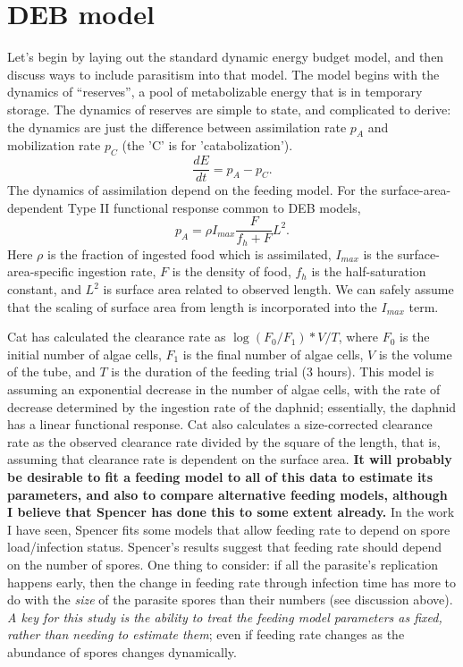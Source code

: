 \documentclass[11pt,reqno,final,pdftex]{amsart}\usepackage[]{graphicx}\usepackage[]{color}
\theoremstyle{plain}
\numberwithin{equation}{part}
\begin{document}
\section*{DEB model}

Let's begin by laying out the standard dynamic energy budget model, and then discuss ways to include parasitism into that model.
The model begins with the dynamics of ``reserves'', a pool of metabolizable energy that is in temporary storage.
The dynamics of reserves are simple to state, and complicated to derive: the dynamics are just the difference between assimilation rate $p_A$ and mobilization rate $p_C$ (the 'C' is for 'catabolization').
\begin{equation}
\frac{dE}{dt} = p_A - p_C.
\end{equation}
The dynamics of assimilation depend on the feeding model. For the surface-area-dependent Type II functional response common to DEB models,
\begin{equation}
p_A = \rho I_{max} \frac{F}{f_h + F} L^2.
\end{equation}
Here $\rho$ is the fraction of ingested food which is assimilated, $I_{max}$ is the surface-area-specific ingestion rate, $F$ is the density of food, $f_h$ is the half-saturation constant, and $L^2$ is surface area related to observed length.
We can safely assume that the scaling of surface area from length is incorporated into the $I_{max}$ term.

Cat has calculated the clearance rate as $\log(F_0/F_1)*V/T$, where $F_0$ is the initial number of algae cells, $F_1$ is the final number of algae cells, $V$ is the volume of the tube, and $T$ is the duration of the feeding trial (3 hours).
This model is assuming an exponential decrease in the number of algae cells, with the rate of decrease determined by the ingestion rate of the daphnid; essentially, the daphnid has a linear functional response.
Cat also calculates a size-corrected clearance rate as the observed clearance rate divided by the square of the length, that is, assuming that clearance rate is dependent on the surface area.
\textbf{It will probably be desirable to fit a feeding model to all of this data to estimate its parameters, and also to compare alternative feeding models, although I believe that Spencer has done this to some extent already.}
In the work I have seen, Spencer fits some models that allow feeding rate to depend on spore load/infection status.
Spencer's results suggest that feeding rate should depend on the number of spores.
One thing to consider: if all the parasite's replication happens early, then the change in feeding rate through infection time has more to do with the \emph{size} of the parasite spores than their numbers (see discussion above).
\emph{A key for this study is the ability to treat the feeding model parameters as fixed, rather than needing to estimate them}; even if feeding rate changes as the abundance of spores changes dynamically.
\end{document}
